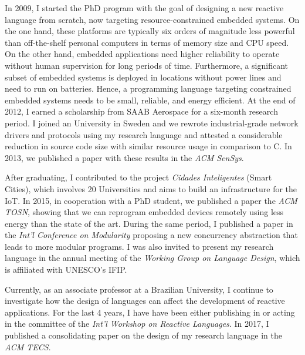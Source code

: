 \documentclass[12pt,english]{amsart}
\begin{document}
In 2009, I started the PhD program with the goal of designing a new
reactive language from scratch, now targeting resource-constrained embedded
systems.
On the one hand, these platforms are typically six orders of magnitude less
powerful than off-the-shelf personal computers in terms of memory size and CPU
speed.
On the other hand, embedded applications need higher reliability to operate
without human supervision for long periods of time.
Furthermore, a significant subset of embedded systems is deployed in locations
without power lines and need to run on batteries.
Hence, a programming language targeting constrained embedded systems needs to
be small, reliable, and energy efficient.
At the end of 2012, I earned a scholarship from SAAB Aerospace for a six-month
research period. %
I joined an University in Sweden and
we rewrote industrial-grade network drivers and protocols using my
research language and attested a considerable reduction in source code size
with similar resource usage in comparison to C. %
In 2013, we published a paper with these results in the \emph{ACM SenSys}.

After graduating, I contributed to the
project \emph{Cidades Inteligentes} (Smart Cities), which involves 20 
Universities and aims to build an infrastructure for the IoT.
%
In 2015, in cooperation with a PhD student, we published a paper the
\emph{ACM TOSN}, showing that we can reprogram embedded devices remotely using
less energy than the state of the art.
%
During the same period, I published a paper in the \emph{Int'l Conference on Modularity}
proposing a new concurrency abstraction that leads to more modular
programs.
%
I was also invited to present my research language in the annual
meeting of the \emph{Working Group on Language Design}, which is affiliated
with UNESCO's IFIP.%

Currently, as an associate professor at a Brazilian University,
I continue to investigate how the design of languages can affect
the development of reactive applications.
For the last 4 years, I have have been either publishing in or acting in the
committee of the \emph{Int'l Workshop on Reactive Languages}.
In 2017, I published a consolidating paper on the design of
my research language in the \emph{ACM TECS}.

\end{document}
